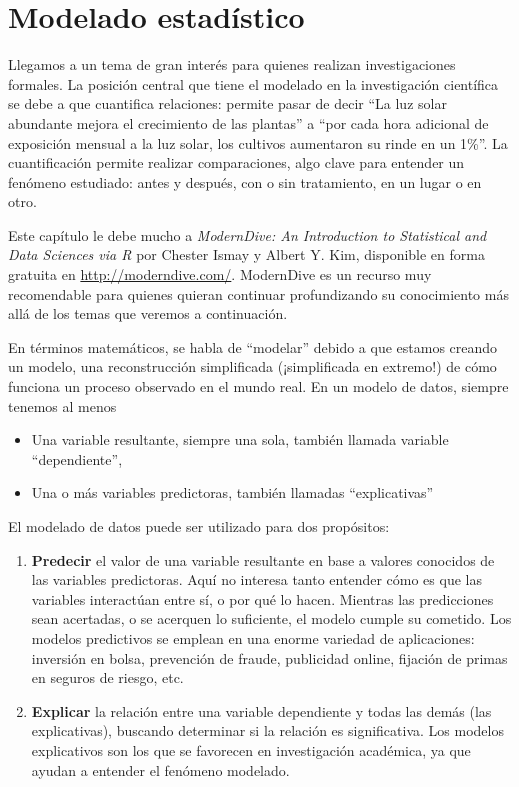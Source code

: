 \documentclass[]{book}
\providecommand{\tightlist}{%
  \setlength{\itemsep}{0pt}\setlength{\parskip}{0pt}}
\begin{document}
\chapter{Modelado estadístico}\label{modelado-estadistico}

Llegamos a un tema de gran interés para quienes realizan investigaciones
formales. La posición central que tiene el modelado en la investigación
científica se debe a que cuantifica relaciones: permite pasar de decir
``La luz solar abundante mejora el crecimiento de las plantas'' a ``por
cada hora adicional de exposición mensual a la luz solar, los cultivos
aumentaron su rinde en un 1\%''. La cuantificación permite realizar
comparaciones, algo clave para entender un fenómeno estudiado: antes y
después, con o sin tratamiento, en un lugar o en otro.

Este capítulo le debe mucho a \emph{ModernDive: An Introduction to
Statistical and Data Sciences via R} por Chester Ismay y Albert Y. Kim,
disponible en forma gratuita en \url{http://moderndive.com/}. ModernDive
es un recurso muy recomendable para quienes quieran continuar
profundizando su conocimiento más allá de los temas que veremos a
continuación.

En términos matemáticos, se habla de ``modelar'' debido a que estamos
creando un modelo, una reconstrucción simplificada (¡simplificada en
extremo!) de cómo funciona un proceso observado en el mundo real. En un
modelo de datos, siempre tenemos al menos

\begin{itemize}
\tightlist
\item
  Una variable resultante, siempre una sola, también llamada variable
  ``dependiente'',
\item
  Una o más variables predictoras, también llamadas ``explicativas''
\end{itemize}

El modelado de datos puede ser utilizado para dos propósitos:

\begin{enumerate}
\def\labelenumi{\arabic{enumi}.}
\item
  \textbf{Predecir} el valor de una variable resultante en base a
  valores conocidos de las variables predictoras. Aquí no interesa tanto
  entender cómo es que las variables interactúan entre sí, o por qué lo
  hacen. Mientras las predicciones sean acertadas, o se acerquen lo
  suficiente, el modelo cumple su cometido. Los modelos predictivos se
  emplean en una enorme variedad de aplicaciones: inversión en bolsa,
  prevención de fraude, publicidad online, fijación de primas en seguros
  de riesgo, etc.
\item
  \textbf{Explicar} la relación entre una variable dependiente y todas
  las demás (las explicativas), buscando determinar si la relación es
  significativa. Los modelos explicativos son los que se favorecen en
  investigación académica, ya que ayudan a entender el fenómeno
  modelado.
\end{enumerate}
\end{document}
